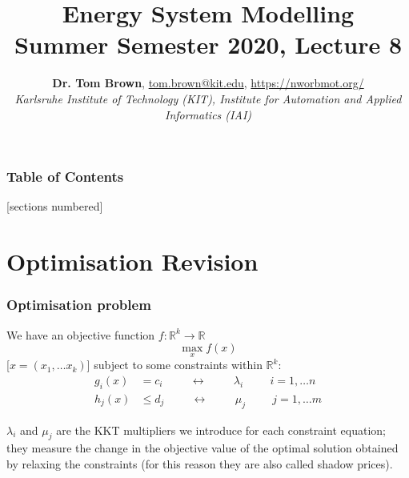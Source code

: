 \documentclass[10pt,aspectratio=169,dvipsnames]{beamer}
\title{Energy System Modelling\\ Summer Semester 2020, Lecture 8}
\author{
  {\bf Dr. Tom Brown}, \href{mailto:tom.brown@kit.edu}{tom.brown@kit.edu}, \url{https://nworbmot.org/}\\
  \emph{Karlsruhe Institute of Technology (KIT), Institute for Automation and Applied Informatics (IAI)}
}
\date{}
\newcommand{\R}{\mathbb{R}}
\def\l{\lambda}
\def\m{\mu}
\begin{document}
\maketitle


\begin{frame}

  \frametitle{Table of Contents}
  [sections numbered]
  \tableofcontents[hideallsubsections]
\end{frame}


\section{Optimisation Revision}

\begin{frame}
  \frametitle{Optimisation problem}


We have an \alert{objective function} $f: \R^k \to \R$
\begin{equation*}
  \max_{x} f(x)
\end{equation*}
[$x = (x_1, \dots x_k)$] subject to some \alert{constraints} within $\R^k$:
\begin{align*}
  g_i(x) & = c_i \hspace{1cm}\leftrightarrow\hspace{1cm} \l_i \hspace{1cm} i = 1,\dots n \\
  h_j(x) & \leq d_j \hspace{1cm}\leftrightarrow\hspace{1cm} \m_j \hspace{1cm} j = 1,\dots m
\end{align*}

$\l_i$ and $\m_j$ are the \alert{KKT multipliers} we introduce for
each constraint equation; they measure the change in the objective value of the optimal solution obtained by relaxing the constraints (for this reason they are also called \alert{shadow prices}).

\end{frame}
\end{document}
